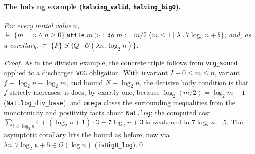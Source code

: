 \documentclass[runningheads]{llncs}
\newcommand{\triple}[4]{\{#1\}\;#2\;\{#3 \mid #4\}}
\newcommand{\Valid}{\vDash}
\newcommand{\BigO}{\mathcal{O}}
\newcommand{\code}[1]{\texttt{#1}}
\begin{document}
\paragraph{The halving example (\code{halving\_valid}, \code{halving\_bigO}).}
\emph{For every initial value $n$,
$\Valid\;\triple{m = n \wedge n \ge 0}{\code{while}\;m > 1\;\code{do}\;m := m/2}
{m \le 1}{\lambda\_.\,7\log_2 n + 5}$;
and, as a corollary, $\Valid\;\triple{P}{S}{Q}{\BigO(\lambda n.\,\log_2 n)}$.}

\begin{proof}
As in the division example, the concrete triple follows from \code{vcg\_sound}
applied to a discharged \code{VCG} obligation. With invariant
$I \equiv 0 \le m \le n$, variant $f \equiv \log_2 n - \log_2 m$, and bound
$N \equiv \log_2 n$, the decisive body condition is that $f$ strictly increases; it
does, by exactly one, because $\log_2(m/2) = \log_2 m - 1$
(\code{Nat.log\_div\_base}), and \code{omega} closes the surrounding inequalities
from the monotonicity and positivity facts about \code{Nat.log}; the computed cost
$\sum_{i<\log_2 n} 4 + (\log_2 n {+} 1)\cdot 3 = 7\log_2 n + 3$ is weakened to
$7\log_2 n + 5$. The asymptotic corollary lifts the bound as before, now via
$\lambda n.\,7\log_2 n + 5 \in \BigO(\log n)$ (\code{isBigO\_log}).\qed
\end{proof}
\end{document}
